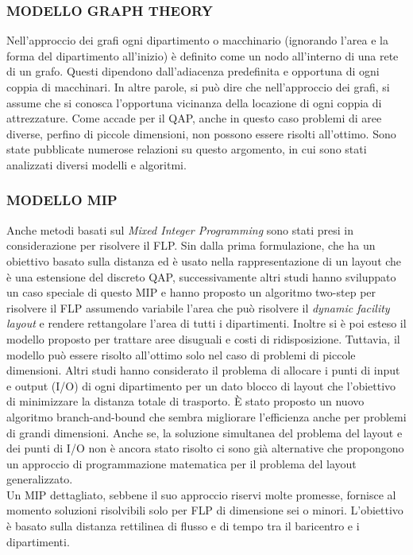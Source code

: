\documentclass[12pt,a4paper,openright,twoside]{report}
\begin{document}
\subsubsection{MODELLO GRAPH THEORY}
Nell'approccio dei grafi ogni dipartimento o macchinario (ignorando l'area e la forma del dipartimento all'inizio) \`{e} definito come un nodo all'interno di una rete di un grafo. Questi dipendono dall'adiacenza predefinita e opportuna di ogni coppia di macchinari. In altre parole, si pu\`{o} dire che nell'approccio dei grafi, si assume che si conosca l'opportuna vicinanza della locazione di ogni coppia di attrezzature. Come accade per il QAP, anche in questo caso problemi di aree diverse, perfino di piccole dimensioni, non possono essere risolti all'ottimo. Sono state pubblicate numerose relazioni su questo argomento, in cui sono stati analizzati diversi modelli e algoritmi. 

\subsubsection{MODELLO MIP}
Anche metodi basati sul \textit{Mixed Integer Programming} sono stati presi in considerazione per risolvere il FLP. Sin dalla prima formulazione, che ha un obiettivo basato sulla distanza ed \`{e} usato nella rappresentazione di un layout che \`{e} una
estensione del discreto QAP, successivamente altri studi hanno sviluppato un caso speciale di questo MIP e hanno proposto un algoritmo two-step per risolvere il FLP assumendo variabile l'area che pu\`{o} risolvere il \textit{dynamic facility layout} e rendere rettangolare l'area di tutti i dipartimenti. Inoltre si \`{e} poi esteso il modello proposto per trattare aree disuguali e costi di ridisposizione. Tuttavia, il modello pu\`{o} essere risolto all'ottimo solo nel caso di problemi di piccole dimensioni.
Altri studi hanno considerato il problema di allocare i punti di input e output (I/O) di ogni dipartimento per un dato blocco di layout che l'obiettivo di minimizzare la distanza totale di trasporto. \`{E} stato proposto un nuovo algoritmo branch-and-bound che sembra migliorare l'efficienza anche per problemi di grandi dimensioni. Anche se, la soluzione simultanea del problema del layout e dei punti di I/O non \`{e} ancora stato risolto ci sono gi\`{a} alternative che propongono un approccio di programmazione matematica per il problema del layout generalizzato.\\
Un MIP dettagliato, sebbene il suo approccio riservi molte promesse, fornisce al momento soluzioni risolvibili solo per FLP di dimensione sei o minori. L'obiettivo \`{e} basato sulla distanza rettilinea di flusso e di tempo tra il baricentro e i dipartimenti.
\end{document}
